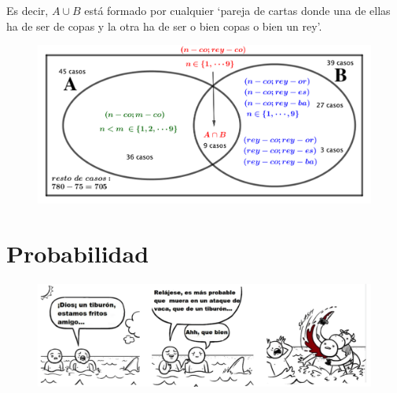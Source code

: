 \begin{ejemplo}
\begin{scriptsize}Es decir, $A\cup B$ está formado por cualquier `pareja de cartas donde una de ellas ha de ser de copas y la otra ha de ser o bien copas o bien un rey'.\end{scriptsize}
\begin{figure}[H]
			\centering
			\includegraphics[width=1\textwidth]{imagenes/imagenes02/T02IM11.png}
	\end{figure}
\end{ejemplo}




\section{Probabilidad}

	\begin{figure}[H]
			\centering
			\includegraphics[width=1\textwidth]{imagenes/imagenes02/T02IM01.png}
	\end{figure}

